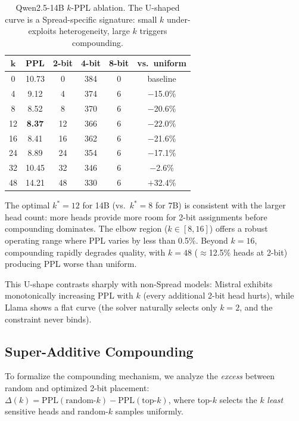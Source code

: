 \documentclass[11pt,a4paper]{article}
\begin{document}
\begin{table}[h]
\centering
\caption{Qwen2.5-14B $k$-PPL ablation. The U-shaped curve is a Spread-specific signature: small $k$ under-exploits heterogeneity, large $k$ triggers compounding.}
\label{tab:kablation14b}
\begin{tabular}{cccccc}
\toprule
$\boldsymbol{k}$ & \textbf{PPL} & \textbf{2-bit} & \textbf{4-bit} & \textbf{8-bit} & \textbf{vs.\ uniform} \\
\midrule
0  & 10.73          & 0   & 384 & 0 & baseline \\
4  & 9.12           & 4   & 374 & 6 & $-$15.0\% \\
8  & 8.52           & 8   & 370 & 6 & $-$20.6\% \\
12 & \textbf{8.37}  & 12  & 366 & 6 & $\mathbf{-22.0\%}$ \\
16 & 8.41           & 16  & 362 & 6 & $-$21.6\% \\
24 & 8.89           & 24  & 354 & 6 & $-$17.1\% \\
32 & 10.45          & 32  & 346 & 6 & $-$2.6\% \\
48 & 14.21          & 48  & 330 & 6 & $+$32.4\% \\
\bottomrule
\end{tabular}
\end{table}

The optimal $k^*{=}12$ for 14B (vs.\ $k^*{=}8$ for 7B) is consistent with the larger head count: more heads provide more room for 2-bit assignments before compounding dominates.
The elbow region ($k \in [8, 16]$) offers a robust operating range where PPL varies by less than 0.5\%.
Beyond $k{=}16$, compounding rapidly degrades quality, with $k{=}48$ ($\approx$12.5\% heads at 2-bit) producing PPL worse than uniform.

This U-shape contrasts sharply with non-Spread models: Mistral exhibits monotonically increasing PPL with $k$ (every additional 2-bit head hurts), while Llama shows a flat curve (the solver naturally selects only $k{=}2$, and the constraint never binds).

\subsection{Super-Additive Compounding}
\label{sec:superadditive}

To formalize the compounding mechanism, we analyze the \emph{excess} between random and optimized 2-bit placement: $\Delta(k) = \text{PPL}(\text{random-}k) - \text{PPL}(\text{top-}k)$, where top-$k$ selects the $k$ \emph{least} sensitive heads and random-$k$ samples uniformly.
\end{document}
